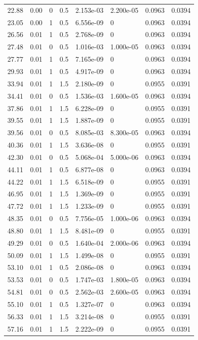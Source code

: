 \documentclass[preview]{standalone}
\begin{document}
{{\begin{tabular}{L{1.2cm}C{1.2cm} C{0.3cm}C{0.5cm} C{1.4cm}C{1.4cm} C{1.4cm}C{1.4cm}}
  22.88  &  0.00  & 0     & 0.5 &  2.153e-03  & 2.200e-05  & 0.0963 &  0.0394   \\ 
  23.05  &  0.00  & 1     & 0.5 &  6.556e-09  & 0  & 0.0963 &  0.0394   \\ 
  26.56  &  0.01  & 1     & 0.5 &  2.768e-09  & 0  & 0.0963 &  0.0394   \\ 
  27.48  &  0.01  & 0     & 0.5 &  1.016e-03  & 1.000e-05  & 0.0963 &  0.0394   \\ 
  27.77  &  0.01  & 1     & 0.5 &  7.165e-09  & 0  & 0.0963 &  0.0394   \\ 
  29.93  &  0.01  & 1     & 0.5 &  4.917e-09  & 0  & 0.0963 &  0.0394   \\ 
  33.94  &  0.01  & 1     & 1.5 &  2.180e-09  & 0  & 0.0955 &  0.0391   \\ 
  34.41  &  0.01  & 0     & 0.5 &  1.536e-03  & 1.600e-05  & 0.0963 &  0.0394   \\ 
  37.86  &  0.01  & 1     & 1.5 &  6.228e-09  & 0  & 0.0955 &  0.0391   \\ 
  39.55  &  0.01  & 1     & 1.5 &  1.887e-09  & 0  & 0.0955 &  0.0391   \\ 
  39.56  &  0.01  & 0     & 0.5 &  8.085e-03  & 8.300e-05  & 0.0963 &  0.0394   \\ 
  40.36  &  0.01  & 1     & 1.5 &  3.636e-08  & 0  & 0.0955 &  0.0391   \\ 
  42.30  &  0.01  & 0     & 0.5 &  5.068e-04  & 5.000e-06  & 0.0963 &  0.0394   \\ 
  44.11  &  0.01  & 1     & 0.5 &  6.877e-08  & 0  & 0.0963 &  0.0394   \\ 
  44.22  &  0.01  & 1     & 1.5 &  6.518e-09  & 0  & 0.0955 &  0.0391   \\ 
  46.95  &  0.01  & 1     & 1.5 &  1.369e-09  & 0  & 0.0955 &  0.0391   \\ 
  47.72  &  0.01  & 1     & 1.5 &  1.233e-09  & 0  & 0.0955 &  0.0391   \\ 
  48.35  &  0.01  & 0     & 0.5 &  7.756e-05  & 1.000e-06  & 0.0963 &  0.0394   \\ 
  48.80  &  0.01  & 1     & 1.5 &  8.481e-09  & 0  & 0.0955 &  0.0391   \\ 
  49.29  &  0.01  & 0     & 0.5 &  1.640e-04  & 2.000e-06  & 0.0963 &  0.0394   \\ 
  50.09  &  0.01  & 1     & 1.5 &  1.499e-08  & 0  & 0.0955 &  0.0391   \\ 
  53.10  &  0.01  & 1     & 0.5 &  2.086e-08  & 0  & 0.0963 &  0.0394   \\ 
  53.53  &  0.01  & 0     & 0.5 &  1.747e-03  & 1.800e-05  & 0.0963 &  0.0394   \\ 
  54.81  &  0.01  & 0     & 0.5 &  2.562e-03  & 2.600e-05  & 0.0963 &  0.0394   \\ 
  55.10  &  0.01  & 1     & 0.5 &  1.327e-07  & 0  & 0.0963 &  0.0394   \\ 
  56.33  &  0.01  & 1     & 1.5 &  3.214e-08  & 0  & 0.0955 &  0.0391   \\ 
  57.16  &  0.01  & 1     & 1.5 &  2.222e-09  & 0  & 0.0955 &  0.0391   \\ 
\hline 
\end{tabular} 

}}
\end{document}
